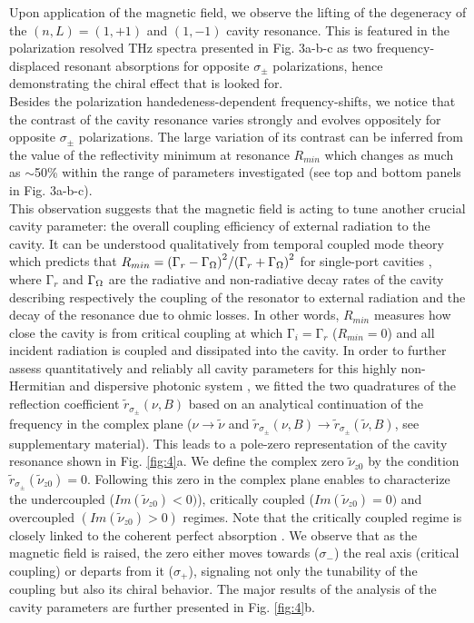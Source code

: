 \documentclass[twocolumn]{article}
\begin{document}
\noindent Upon application of the magnetic field, we observe the lifting of the degeneracy of the $\left(n,L\right)=(1,+1)$ and $(1,-1)$ cavity resonance. This is featured in the polarization resolved THz spectra presented in Fig. 3a-b-c as two frequency-displaced resonant absorptions for opposite ${\sigma }_{\pm }$ polarizations, hence demonstrating the chiral effect that is looked for. \\ 
\noindent Besides the polarization handedeness-dependent frequency-shifts, we notice that the contrast of the cavity resonance varies strongly and evolves oppositely for opposite ${\sigma }_{\pm }$ polarizations. The large variation of its contrast can be inferred from the value of the reflectivity minimum at resonance $R_{min}$ which changes as much as $\sim $50\% within the range of parameters investigated (see top and bottom panels in Fig. 3a-b-c). \\
\noindent This observation suggests that the magnetic field is acting to tune another crucial cavity parameter: the overall coupling efficiency of external radiation to the cavity. It can be understood qualitatively from temporal coupled mode theory \cite{Fan_2003} which predicts that $R_{min}={({\mathrm{\Gamma }}_r-{\mathrm{\Gamma }}_{\ohm})}^2/{({\mathrm{\Gamma }}_r+{\mathrm{\Gamma }}_\ohm)}^2$ for single-port cavities \cite{Manceau_2013,Qu_2015}, where ${\mathrm{\Gamma }}_r$ and ${\mathrm{\Gamma }}_\ohm$ are the radiative and non-radiative decay rates of the cavity describing respectively the coupling of the resonator to external radiation and the decay of the resonance due to ohmic losses. In other words, $R_{min}$ measures how close the cavity is from critical coupling at which ${\mathrm{\Gamma }}_i={\mathrm{\Gamma }}_r$ ($R_{min}=0$) and all incident radiation is coupled and dissipated into the cavity. In order to further assess quantitatively and reliably all cavity parameters for this highly non-Hermitian and dispersive photonic system \cite{Alpeggiani_2017,Zhang2020,Benzaouia_2021}, we fitted the two quadratures of the reflection coefficient $\tilde{r}_{{\sigma }_\pm}(\nu,B)$ based on an analytical continuation of the frequency in the complex plane \cite{Popov_1986,Nevi_re_1995,Binkowski_2024} ($\nu \rightarrow\tilde{\nu}$ and $\tilde{r}_{{\sigma }_\pm}(\nu,B)\rightarrow \tilde{r}_{{\sigma }_\pm}(\tilde{\nu},B)$, see supplementary material). This leads to a pole-zero representation of the cavity resonance shown in Fig. \ref{fig:4}a. We define the complex zero $\tilde{\nu}_{z0}$ by the condition  $\tilde{r}_{{\sigma }_\pm}(\tilde{\nu}_{z0})=0$.  Following this zero in the complex plane enables to characterize the undercoupled ($Im(\tilde{\nu}_{z0})<0)$), critically coupled ($Im(\tilde{\nu}_{z0})=0)$ and overcoupled $(Im(\tilde{\nu}_{z0})>0)$ regimes. Note that the critically coupled regime is closely linked to the coherent perfect absorption \cite{Chong_2010,Wan_2011,Sweeney_2020}. We observe that as the magnetic field is raised, the zero either moves towards ($\sigma_{-}$) the real axis (critical coupling) or departs from it ($\sigma_{+}$), signaling not only the tunability of the coupling but also its chiral behavior. The major results of the analysis of the cavity parameters are further presented in Fig. \ref{fig:4}b.\\
\end{document}
